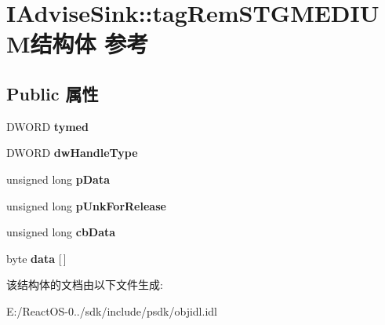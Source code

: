 \hypertarget{struct_i_advise_sink_1_1tag_rem_s_t_g_m_e_d_i_u_m}{}\section{I\+Advise\+Sink\+:\+:tag\+Rem\+S\+T\+G\+M\+E\+D\+I\+U\+M结构体 参考}
\label{struct_i_advise_sink_1_1tag_rem_s_t_g_m_e_d_i_u_m}
\subsection*{Public 属性}
\begin{DoxyCompactItemize}
\item 
\mbox{\label{struct_i_advise_sink_1_1tag_rem_s_t_g_m_e_d_i_u_m_aba67373e44cad98e34d9b98cc5313e3f}} 
D\+W\+O\+RD {\bfseries tymed}
\item 
\mbox{\label{struct_i_advise_sink_1_1tag_rem_s_t_g_m_e_d_i_u_m_a3c9332643e23a7d22a6ecc9a560c8209}} 
D\+W\+O\+RD {\bfseries dw\+Handle\+Type}
\item 
\mbox{\label{struct_i_advise_sink_1_1tag_rem_s_t_g_m_e_d_i_u_m_a2712665b6da1209a5b7c17656da174a8}} 
unsigned long {\bfseries p\+Data}
\item 
\mbox{\label{struct_i_advise_sink_1_1tag_rem_s_t_g_m_e_d_i_u_m_a4f8984d60cc36b147ddb35980a6cf23a}} 
unsigned long {\bfseries p\+Unk\+For\+Release}
\item 
\mbox{\label{struct_i_advise_sink_1_1tag_rem_s_t_g_m_e_d_i_u_m_a4635fb9ffaa3a0167706db602544f0f8}} 
unsigned long {\bfseries cb\+Data}
\item 
\mbox{\label{struct_i_advise_sink_1_1tag_rem_s_t_g_m_e_d_i_u_m_a44cab9562ac6c5a5631b967eb1f85cdb}} 
byte {\bfseries data} \mbox{[}$\,$\mbox{]}
\end{DoxyCompactItemize}


该结构体的文档由以下文件生成\+:\begin{DoxyCompactItemize}
\item 
E\+:/\+React\+O\+S-\/0../sdk/include/psdk/objidl.\+idl\end{DoxyCompactItemize}
